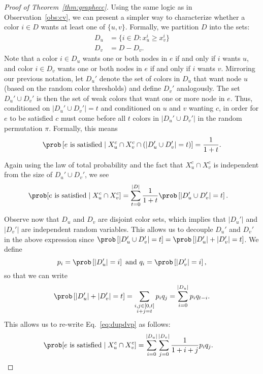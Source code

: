 \begin{proof}[Proof of Theorem~\ref{thm:graphecc}]
	Using the same logic as in Observation~\ref{obs:cv}, we can present a simpler way to characterize whether a color $i \in D$ wants at least one of $\{u,v\}$. Formally, we partition $D$ into the sets:
	\begin{align*}
		D_u &= \{i \in D \colon x_u^i \geq x_v^i \} \\
		D_v &= D - D_v.
	\end{align*}
	Note that a color $i \in D_u$ wants one or both nodes in $e$ if and only if $i$ wants $u$, and color $i \in D_v$ wants one or both nodes in $e$ if and only if $i$ wants $v$.  
	Mirroring our previous notation, let $D_u'$ denote the set of colors in $D_u$ that want node $u$ (based on the random color thresholds) and define $D_v'$ analogously. The set $D_u' \cup D_v'$ is then the set of weak colors that want one or more node in $e$. Thus, conditioned on $|D_u' \cup D_v'| = t$ and conditioned on $u$ and $v$ wanting $c$, in order for $e$ to be satisfied $c$ must come before all $t$ colors in $|D_u' \cup D_v'|$ in the random permutation $\pi$. Formally, this means
	\[
	\prob\left[ \text{$e$ is satisfied} \mid X_u^c \cap X_v^c \cap (|D'_u \cup D'_v| = t) \right] = \frac{1}{1 + t}.
	\]
	
	Again using the law of total probability and the fact that $X_u^c \cap X_v^c$ is independent from the size of $D_u' \cup D_v'$, we see
	\begin{align}
		\label{eq:dupdvp}
		\prob[ e &\text{ is satisfied} \mid X_u^c \cap X_v^c ]
		= \sum_{t = 0}^{|D|} \frac{1}{1+t} \prob\left[ |D'_u \cup D'_v| = t \right].
	\end{align}
	
	Observe now that $D_u$ and $D_v$ are disjoint color sets, which implies that $|D_u'|$ and $|D_v'|$ are independent random variables. This allows us to decouple $D_u'$ and $D_v'$ in the above expression since $\prob\left[ |D'_u \cup D'_v| = t \right] = \prob\left[ |D'_u| + |D'_v| = t \right]$. We define 
	\[
	p_i = \prob\left[ |D'_u| = i \right] \text{ and } q_i = \prob\left[ |D'_v| = i \right],
	\] 
	so that we can write
	\[
	\prob\left[ |D'_u| + |D'_v| = t \right] = \sum_{\substack{i, j \in [0, t] \\ i + j = t}} p_i q_j = \sum_{i = 0}^{|D_u|} p_i q_{t-i} .
	\]
	This allows us to re-write Eq.~\eqref{eq:dupdvp} as follows:
	\begin{align}
		\label{eq:decoupled}
		\prob[ e \text{ is satisfied} \mid X_u^c \cap X_v^c ] &= \sum_{i = 0}^{|D_u|} \sum_{j = 0}^{|D_v|} \frac{1}{1+i+j} p_i q_j.
	\end{align}
	

\end{proof}
